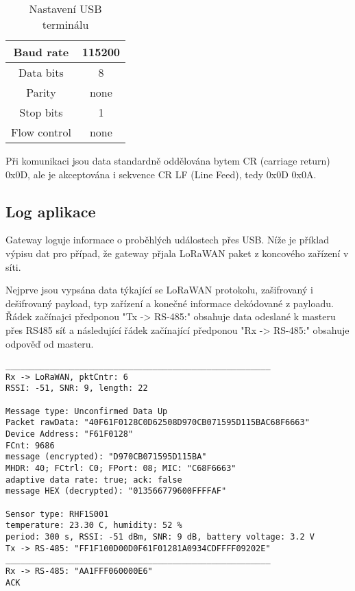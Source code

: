\begin{table}[!h]
    \centering
    \begin{tabular}{ |c|c| }
     \hline

     Baud rate              & 115200           \\ \hline
     Data bits              & 8                 \\ \hline
     Parity                 & none              \\ \hline
     Stop bits              & 1                 \\ \hline
     Flow control           & none               \\ \hline

    \end{tabular}
    \caption{Nastavení USB terminálu}
    \label{table:usb_term}
\end{table}

Při komunikaci jsou data standardně oddělována bytem CR (carriage return) 0x0D, ale je akceptována i sekvence CR LF (Line Feed), tedy 0x0D 0x0A. 

\subsection{Log aplikace}
Gateway loguje informace o proběhlých událostech přes USB. 
Níže je příklad výpisu dat pro případ, že gateway přjala LoRaWAN paket z koncového zařízení v síti.

Nejprve jsou vypsána data týkající se LoRaWAN protokolu, zašifrovaný i dešifrovaný payload, typ zařízení a konečné informace dekódované z payloadu.
Řádek začínajci předponou "Tx -> RS-485:" obsahuje data odeslané k masteru přes RS485 síť a následující řádek začínající předponou "Rx -> RS-485:" obsahuje odpověď od masteru.

\begin{lstlisting}
______________________________________________________
Rx -> LoRaWAN, pktCntr: 6
RSSI: -51, SNR: 9, length: 22

Message type: Unconfirmed Data Up
Packet rawData: "40F61F0128C0D62508D970CB071595D115BAC68F6663"
Device Address: "F61F0128"
FCnt: 9686
message (encrypted): "D970CB071595D115BA"
MHDR: 40; FCtrl: C0; FPort: 08; MIC: "C68F6663"
adaptive data rate: true; ack: false
message HEX (decrypted): "013566779600FFFFAF"

Sensor type: RHF1S001
temperature: 23.30 C, humidity: 52 %
period: 300 s, RSSI: -51 dBm, SNR: 9 dB, battery voltage: 3.2 V
Tx -> RS-485: "FF1F100D00D0F61F01281A0934CDFFFF09202E"
______________________________________________________
Rx -> RS-485: "AA1FFF060000E6"
ACK
\end{lstlisting}

